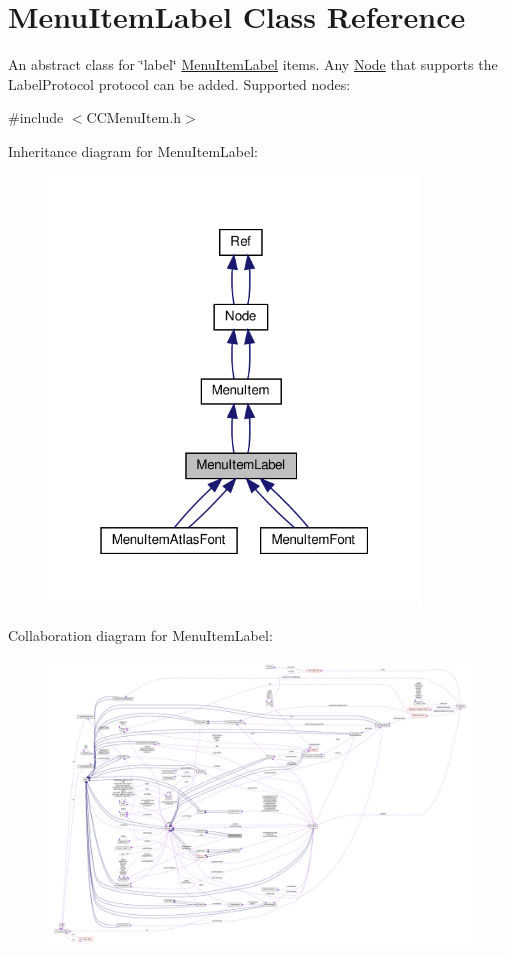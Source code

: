 \hypertarget{classMenuItemLabel}{}\section{Menu\+Item\+Label Class Reference}
\label{classMenuItemLabel}


An abstract class for \char`\"{}label\char`\"{} \hyperlink{classMenuItemLabel}{Menu\+Item\+Label} items. Any \hyperlink{classNode}{Node} that supports the Label\+Protocol protocol can be added. Supported nodes\+:  




{\ttfamily \#include $<$C\+C\+Menu\+Item.\+h$>$}



Inheritance diagram for Menu\+Item\+Label\+:
\nopagebreak
\begin{figure}[H]
\begin{center}
\leavevmode
\includegraphics[width=280pt]{classMenuItemLabel__inherit__graph}
\end{center}
\end{figure}


Collaboration diagram for Menu\+Item\+Label\+:
\nopagebreak
\begin{figure}[H]
\begin{center}
\leavevmode
\includegraphics[width=350pt]{classMenuItemLabel__coll__graph}
\end{center}
\end{figure}
